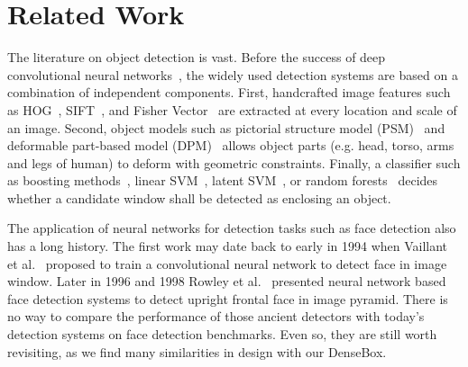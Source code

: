 \section{Related Work}

The literature on object detection is vast. Before the success of deep convolutional neural networks~\cite{krizhevsky2012imagenet}, the widely used detection systems are based on a combination of independent components. First, handcrafted image features such as HOG~\cite{dalal2005histograms}, SIFT~\cite{lowe2004distinctive}, and Fisher Vector~\cite{cinbis2013segmentation} are extracted at every location and scale of an image. Second, object models such as pictorial structure model (PSM)~\cite{felzenszwalb2005pictorial} and deformable part-based model (DPM)~\cite{felzenszwalb2010object, zhu2012face, yang2013articulated} allows object parts (e.g. head, torso, arms and legs of human) to deform with geometric constraints. Finally, a classifier such as boosting methods~\cite{viola2004robust}, linear SVM~\cite{dalal2005histograms}, latent SVM~\cite{felzenszwalb2010object}, or random forests~\cite{dollar2012crosstalk} decides whether a candidate window shall be detected as enclosing an object. 


The application of neural networks for detection tasks such as face detection also has a long history. The first work may date back to early in 1994 when Vaillant et al.~\cite{vaillant1994original} proposed to train a convolutional neural network to detect face in image window. Later in 1996 and 1998 Rowley et al.~\cite{rowley1998neural,rowley1998rotation} presented neural network based face detection systems to detect upright frontal face in image pyramid. There is no way to compare the performance of those ancient detectors with today’s detection systems on face detection benchmarks. Even so, they are still worth revisiting, as we find many similarities in design with our DenseBox. 

